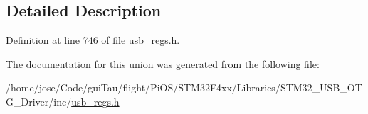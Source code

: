 \subsection{Detailed Description}


Definition at line 746 of file usb\-\_\-regs.\-h.



The documentation for this union was generated from the following file\-:\begin{DoxyCompactItemize}
\item 
/home/jose/\-Code/gui\-Tau/flight/\-Pi\-O\-S/\-S\-T\-M32\-F4xx/\-Libraries/\-S\-T\-M32\-\_\-\-U\-S\-B\-\_\-\-O\-T\-G\-\_\-\-Driver/inc/\hyperlink{_s_t_m32_f4xx_2_libraries_2_s_t_m32___u_s_b___o_t_g___driver_2inc_2usb__regs_8h}{usb\-\_\-regs.\-h}\end{DoxyCompactItemize}
